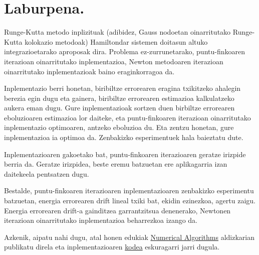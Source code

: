 \section{Laburpena.}

Runge-Kutta metodo inplizituak (adibidez, Gauss nodoetan oinarritutako Runge-Kutta kolokazio metodoak) Hamiltondar sistemen doitasun altuko integrazioetarako aproposak dira. Problema ez-zurrunetarako, puntu-finkoaren iterazioan oinarritutako inplementazioa, Newton metodoaren iterazioan oinarritutako inplementazioak baino eraginkorragoa da.

Inplementazio berri honetan, biribiltze errorearen eragina txikitzeko ahalegin berezia egin dugu eta  gainera, biribiltze errorearen estimazioa kalkulatzeko aukera eman dugu. Gure inplementazioak sortzen duen birbiltze errorearen eboluzioaren estimazioa lor daiteke, eta puntu-finkoaren iterazioan oinarritutako inplementazio optimoaren, antzeko eboluzioa du. Eta zentzu honetan, gure inplementazioa ia optimoa da. Zenbakizko esperimentuek hala baieztatu dute.

Inplementazioaren gakoetako bat, puntu-finkoaren iterazioaren geratze irizpide berria da. Geratze irizpidea, beste eremu batzuetan ere aplikagarria izan daitekeela pentsatzen dugu.

Bestalde, puntu-finkoaren iterazioaren inplementazioaren zenbakizko esperimentu batzuetan,  energia errorearen drift lineal txiki bat, ekidin ezinezkoa, agertu zaigu. Energia errorearen drift-a gainditzea garrantzitsua denenerako, Newtonen iterazioan oinarritutako inplementazioa beharrezkoa izango da.

Azkenik, aipatu nahi dugu, atal honen edukiak \href{http://link.springer.com/journal/11075}{Numerical Algorithms} aldizkarian publikatu direla \cite{Antonana2017} eta inplementazioaren \href{https://github.com/mikelehu/IRK-FixedPoint}{kodea} eskuragarri jarri dugula. 